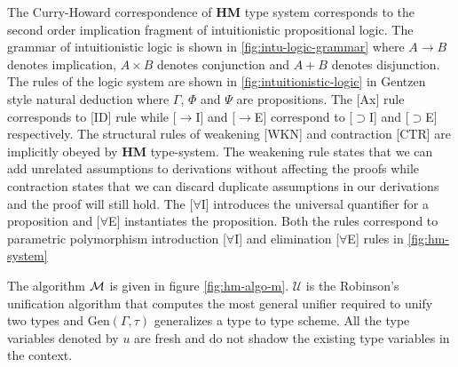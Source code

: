 The Curry-Howard correspondence of \textbf{HM} type system
corresponds to the second order implication fragment of intuitionistic propositional logic.
The grammar of intuitionistic logic is shown in \cref{fig:intu-logic-grammar} where $A \rightarrow B$ denotes implication,
$A \times B$ denotes conjunction and $A \plus B$ denotes disjunction.
The rules of the logic system are shown in \cref{fig:intuitionistic-logic} in Gentzen style natural deduction
where $\Gamma$, $\Phi$ and $\Psi$ are propositions. The [Ax] rule corresponds to [ID] rule while [$\rightarrow$I] and [$\rightarrow$E] correspond
to [$\supset$I] and [$\supset$E] respectively. The structural rules of weakening [WKN] and contraction [CTR] are implicitly obeyed
by \textbf{HM} type-system. The weakening rule states that we can add unrelated assumptions to derivations without
affecting the proofs while contraction states that we can discard duplicate assumptions in our derivations and the
proof will still hold. The [$\forall$I] introduces the universal quantifier for a proposition and [$\forall$E] instantiates
the proposition. Both the rules correspond to parametric polymorphism introduction [$\forall$I] and elimination [$\forall$E] rules in \cref{fig:hm-system}

The algorithm $\mathcal{M}$ is given in figure \cref{fig:hm-algo-m}. $\mathcal{U}$ is the Robinson's unification
algorithm that computes the most general unifier required to unify two types
and $\text{Gen}(\Gamma,\tau)$ generalizes a type to type scheme. All the type variables denoted by $u$ are
fresh and do not shadow the existing type variables in the context.

